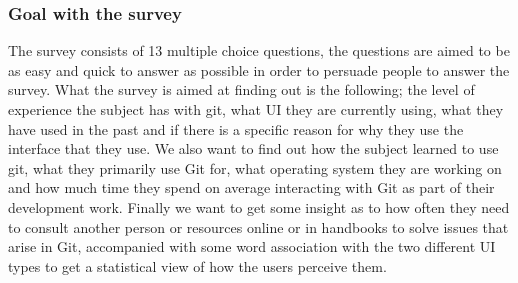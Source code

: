 \documentclass[a4paper,oneside]{bth} %
\begin{document}
					\subsubsection*{Goal with the survey}
					The survey consists of 13 multiple choice questions, the questions are aimed to be as easy and quick to answer as possible in order to persuade people to answer the survey. What the survey is aimed at finding out is the following; the level of experience the subject has with git, what UI they are currently using, what they have used in the past and if there is a specific reason for why they use the interface that they use. We also want to find out how the subject learned to use git, what they primarily use Git for, what operating system they are working on and how much time they spend on average interacting with Git as part of their development work. Finally we want to get some insight as to how often they need to consult another person or resources online or in handbooks to solve issues that arise in Git, accompanied with some word association with the two different UI types to get a statistical view of how the users perceive them.
					
\end{document}
